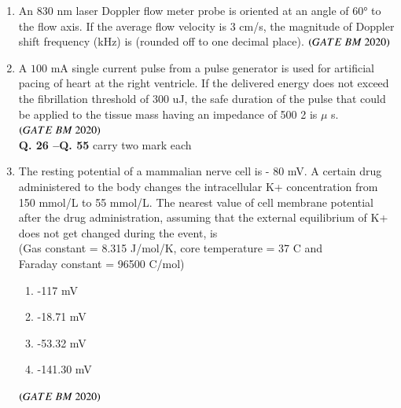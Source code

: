 \documentclass[journal,12pt,onecolumn]{IEEEtran}
\theoremstyle{remark}
\begin{document}
\begin{enumerate}
\item An 830 nm laser Doppler flow meter probe is oriented at an angle of 60° to the flow
axis. If the average flow velocity is 3 cm/s, the magnitude of Doppler shift
frequency (kHz) is \underline{\hspace{2cm}} (rounded off to one decimal place).  \hfill $\brak{GATE\ BM\ 2020}$\\

\item A $100$ mA single current pulse from a pulse generator is used for artificial pacing of
heart at the right ventricle. If the delivered energy does not exceed the fibrillation
threshold of $300$ uJ, the safe duration of the pulse that could be applied to the tissue
mass having an impedance of 500 2 is \underline{\hspace{2cm}} $\mu$ s.  \hfill $\brak{GATE\ BM\ 2020}$\\

\noindent \textbf{Q. 26 --Q.  \textbf{55}} carry two mark each

\item The resting potential of a mammalian nerve cell is - 80 mV. A certain drug
administered to the body changes the intracellular K+ concentration from 150
mmol/L to 55 mmol/L. The nearest value of cell membrane potential after the
drug administration, assuming that the external equilibrium of K+ does not get
changed during the event, is \\

(Gas constant = 8.315 J/mol/K, core temperature = 37 C and\\

Faraday constant = 96500 C/mol)
\begin{enumerate}[label=\alph*)] 
\item\hspace{0.5cm}-117 mV
\item\hspace{0.5cm}-18.71 mV
\item\hspace{0.5cm}-53.32 mV
\item\hspace{0.5cm}-141.30 mV
\end{enumerate}
\hfill $\brak{GATE\ BM\ 2020}$\\


\end{enumerate}
\end{document}
